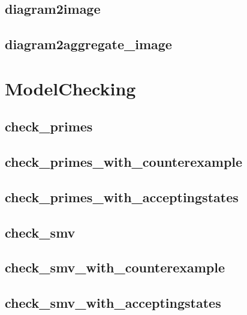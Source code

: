\documentclass[letterpaper,10pt,english]{sphinxmanual}
\begin{document}
\subsection{diagram2image}
\label{AttractorBasins:diagram2image}\label{AttractorBasins:id3}

\subsection{diagram2aggregate\_image}
\label{AttractorBasins:id4}\label{AttractorBasins:diagram2aggregate-image}

\section{ModelChecking}
\label{ModelChecking::doc}\label{ModelChecking:modelchecking}\label{ModelChecking:id1}

\subsection{check\_primes}
\label{ModelChecking:id2}\label{ModelChecking:check-primes}

\subsection{check\_primes\_with\_counterexample}
\label{ModelChecking:check-primes-with-counterexample}\label{ModelChecking:id3}

\subsection{check\_primes\_with\_acceptingstates}
\label{ModelChecking:check-primes-with-acceptingstates}\label{ModelChecking:check-primes-with-accepting-states}

\subsection{check\_smv}
\label{ModelChecking:id4}\label{ModelChecking:check-smv}

\subsection{check\_smv\_with\_counterexample}
\label{ModelChecking:id5}\label{ModelChecking:check-smv-with-counterexample}

\subsection{check\_smv\_with\_acceptingstates}
\label{ModelChecking:id6}\label{ModelChecking:check-smv-with-acceptingstates}
\end{document}
